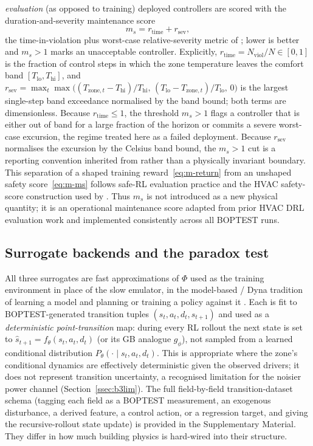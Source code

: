 \documentclass[a4paper,fleqn]{cas-sc}
\begin{document}
\emph{evaluation} (as opposed to training) deployed controllers are scored with the
duration-and-severity maintenance score
\begin{equation}
m_s = r_{\mathrm{time}} + r_{\mathrm{sev}},
\label{eq:m-ms}
\end{equation}
the time-in-violation plus worst-case relative-severity metric of \citet{Wang2025SafeDRL};
lower is better and $m_s>1$ marks an unacceptable controller. Explicitly,
$r_{\mathrm{time}}=N_{\mathrm{viol}}/N\in[0,1]$ is the fraction of control steps in which the
zone temperature leaves the comfort band $[T_{\mathrm{lo}},T_{\mathrm{hi}}]$, and
$r_{\mathrm{sev}}=\max_t\max\!\big((T_{\mathrm{zone},t}-T_{\mathrm{hi}})/T_{\mathrm{hi}},\,
(T_{\mathrm{lo}}-T_{\mathrm{zone},t})/T_{\mathrm{lo}},\,0\big)$ is the largest single-step band
exceedance normalised by the band bound; both terms are dimensionless. Because
$r_{\mathrm{time}}\le 1$, the threshold $m_s>1$ flags a controller that is either out of band for
a large fraction of the horizon or commits a severe worst-case excursion, the regime treated
here as a failed deployment. Because $r_{\mathrm{sev}}$ normalises the excursion by the Celsius band bound, the $m_s>1$ cut is a reporting convention inherited from \citet{Wang2025SafeDRL} rather than a physically invariant boundary. This separation of a
shaped training reward~\eqref{eq:m-return} from an unshaped safety score~\eqref{eq:m-ms}
follows safe-RL evaluation practice \citep{Garcia2015SafeRL} and the HVAC safety-score construction used by \citet{Wang2025SafeDRL}. Thus $m_s$ is not introduced as a new physical quantity; it is an operational maintenance score adapted from prior HVAC DRL evaluation work and implemented consistently across all BOPTEST runs.

\subsection{Surrogate backends and the paradox test}\label{ssec:m-surrogate}
All three surrogates are fast approximations of $\Phi$ used as the training
environment in place of the slow emulator, in the model-based / Dyna tradition of
learning a model and planning or training a policy against it
\citep{Sutton1991Dyna,Hafner2025Dreamer}. Each is fit to BOPTEST-generated
transition tuples $(s_t,a_t,d_t,s_{t+1})$ and used as a \emph{deterministic
point-transition} map: during every RL rollout the next state is set to
$\hat s_{t+1}=f_\theta(s_t,a_t,d_t)$ (or its GB analogue $g_\phi$), not sampled from
a learned conditional distribution $P_\theta(\cdot\mid s_t,a_t,d_t)$. This is
appropriate where the zone's conditional dynamics are effectively deterministic
given the observed drivers; it does not represent transition uncertainty, a
recognised limitation for the noisier power channel (Section~\ref{ssec:b3lim}). The
full field-by-field transition-dataset schema (tagging each field as a BOPTEST
measurement, an exogenous disturbance, a derived feature, a control action, or a
regression target, and giving the recursive-rollout state update) is provided in
the Supplementary Material. They differ in how much building physics is hard-wired
into their structure.
\end{document}
